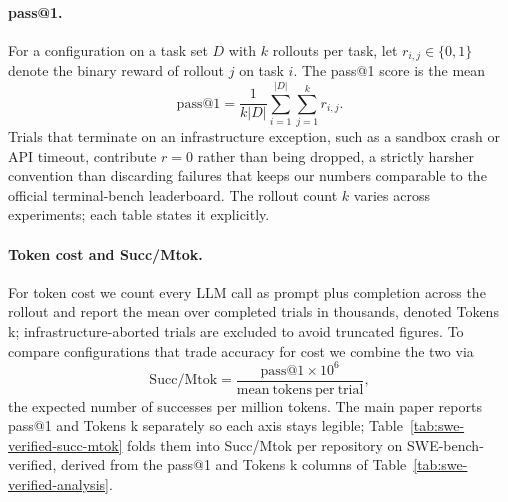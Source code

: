 \paragraph{pass@1.}
For a configuration on a task set $D$ with $k$ rollouts per task, let $r_{i,j} \in \{0, 1\}$ denote the binary reward of rollout $j$ on task $i$. The pass@1 score is the mean
\begin{equation}
    \mathrm{pass@1} = \frac{1}{k|D|} \sum_{i=1}^{|D|} \sum_{j=1}^{k} r_{i,j}.
\end{equation}
Trials that terminate on an infrastructure exception, such as a sandbox crash or API timeout, contribute $r=0$ rather than being dropped, a strictly harsher convention than discarding failures that keeps our numbers comparable to the official terminal-bench leaderboard. The rollout count $k$ varies across experiments; each table states it explicitly.

\paragraph{Token cost and Succ/Mtok.}
For token cost we count every LLM call as prompt plus completion across the rollout and report the mean over completed trials in thousands, denoted Tokens k; infrastructure-aborted trials are excluded to avoid truncated figures. To compare configurations that trade accuracy for cost we combine the two via
\begin{equation}
    \mathrm{Succ/Mtok} = \frac{\mathrm{pass@1} \times 10^{6}}{\mathrm{mean\ tokens\ per\ trial}},
\end{equation}
the expected number of successes per million tokens. The main paper reports pass@1 and Tokens k separately so each axis stays legible; Table~\ref{tab:swe-verified-succ-mtok} folds them into Succ/Mtok per repository on SWE-bench-verified, derived from the pass@1 and Tokens k columns of Table~\ref{tab:swe-verified-analysis}.


